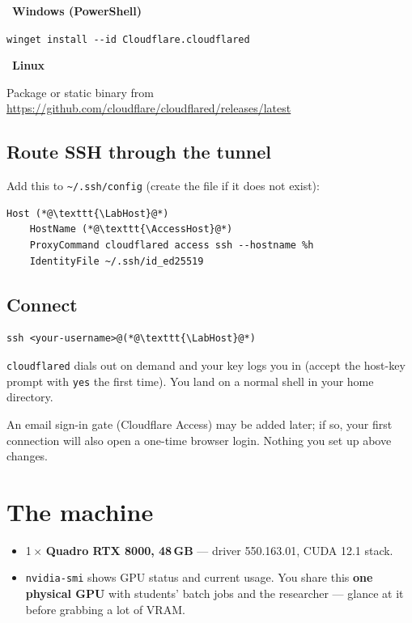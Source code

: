 \documentclass[11pt]{article}
\newcommand{\LabHost}{quarkylab}
\newcommand{\AccessHost}{quarkylab.kylemason.org}
\newcommand{\code}[1]{\texttt{#1}}
\newcommand{\osbadge}[1]{\vspace{0.4ex}\noindent{\color{quarkA}\rule{2pt}{10pt}}\ \textbf{\color{quarkA}#1}\par\nopagebreak\vspace{0.3ex}}
\begin{document}
\osbadge{Windows (PowerShell)}
\code{winget install -{}-id Cloudflare.cloudflared}

\osbadge{Linux}
Package or static binary from \url{https://github.com/cloudflare/cloudflared/releases/latest}

\subsection{Route SSH through the tunnel}
Add this to \code{\textasciitilde/.ssh/config} (create the file if it does not exist):
\begin{lstlisting}
Host (*@\texttt{\LabHost}@*)
    HostName (*@\texttt{\AccessHost}@*)
    ProxyCommand cloudflared access ssh --hostname %h
    IdentityFile ~/.ssh/id_ed25519
\end{lstlisting}

\subsection{Connect}
\begin{lstlisting}
ssh <your-username>@(*@\texttt{\LabHost}@*)
\end{lstlisting}
\code{cloudflared} dials out on demand and your key logs you in (accept the host-key prompt with \code{yes} the first time). You land on a normal shell in your home directory.

\begin{notebox}
An email sign-in gate (Cloudflare Access) may be added later; if so, your first connection will also open a one-time browser login. Nothing you set up above changes.
\end{notebox}

\section{The machine}
\begin{itemize}
  \item 1\,$\times$ \textbf{Quadro RTX 8000, 48\,GB} --- driver 550.163.01, CUDA 12.1 stack.
  \item \code{nvidia-smi} shows GPU status and current usage. You share this \textbf{one physical GPU} with students' batch jobs and the researcher --- glance at it before grabbing a lot of VRAM.
\end{itemize}
\end{document}
